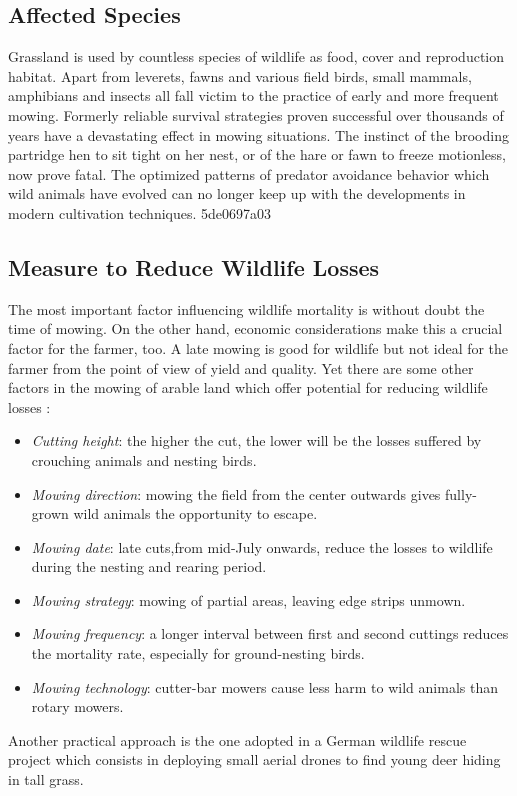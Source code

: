\subsection{Affected Species} %
\label{sub:affected_species}
Grassland is used by countless species of wildlife as food, cover and reproduction habitat. Apart from leverets, fawns and various field birds, small mammals, amphibians and insects all fall victim to the practice of early and more frequent mowing. Formerly reliable survival strategies proven successful over thousands of years have a devastating effect in mowing situations. The instinct of the brooding partridge hen to sit tight on her nest, or of the hare or fawn to freeze motionless, now prove fatal. The optimized patterns of predator avoidance behavior which wild animals have evolved can no longer keep up with the developments in modern cultivation techniques.
5de0697a03
\subsection{Measure to Reduce Wildlife Losses} %
\label{sub:measure_to_reduce_wildlife_losses}
 The most important factor influencing wildlife mortality is without doubt the time of mowing. On the other hand, economic considerations make this a crucial factor for the farmer, too. A late mowing is good for wildlife but not ideal for the farmer from the point of view of yield and quality. Yet there are some other factors in the mowing of arable land which offer potential for reducing wildlife losses \cite{MowlingMortality}:
\begin{itemize}
	\item \textit{Cutting height}: the higher the cut, the lower will be the losses suffered by crouching animals and nesting birds.
	\item \textit{Mowing direction}: mowing the field from the center outwards gives fully-grown wild animals the opportunity to escape.
	\item \textit{Mowing date}: late cuts,from mid-July onwards, reduce the losses to wildlife during the nesting and rearing period.
	\item \textit{Mowing strategy}: mowing of partial areas, leaving edge strips unmown.
	\item \textit{Mowing frequency}: a longer interval between first and second cuttings reduces the mortality rate, especially for ground-nesting birds.
	\item \textit{Mowing technology}: cutter-bar mowers cause less harm to wild animals than rotary mowers.
\end{itemize}
 Another practical approach is the one adopted in a German wildlife rescue project which consists in deploying small aerial drones to find young deer hiding in tall grass.

